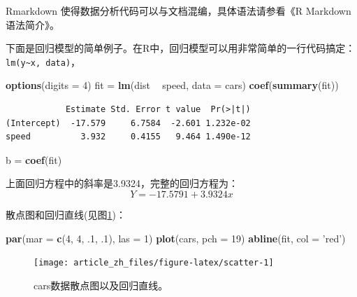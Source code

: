 \documentclass[]{article}
\newenvironment{Shaded}{\begin{snugshade}}{\end{snugshade}}
\newcommand{\DataTypeTok}[1]{\textcolor[rgb]{0.13,0.29,0.53}{#1}}
\newcommand{\DecValTok}[1]{\textcolor[rgb]{0.00,0.00,0.81}{#1}}
\newcommand{\FloatTok}[1]{\textcolor[rgb]{0.00,0.00,0.81}{#1}}
\newcommand{\KeywordTok}[1]{\textcolor[rgb]{0.13,0.29,0.53}{\textbf{#1}}}
\newcommand{\NormalTok}[1]{#1}
\newcommand{\OperatorTok}[1]{\textcolor[rgb]{0.81,0.36,0.00}{\textbf{#1}}}
\newcommand{\StringTok}[1]{\textcolor[rgb]{0.31,0.60,0.02}{#1}}
\begin{document}
Rmarkdown 使得数据分析代码可以与文档混编，具体语法请参看《R
Markdown语法简介》。

下面是回归模型的简单例子。在R中，回归模型可以用非常简单的一行代码搞定：\texttt{lm(y\textasciitilde{}x,\ data)}，

\begin{Shaded}
\begin{Highlighting}[]
\KeywordTok{options}\NormalTok{(}\DataTypeTok{digits =} \DecValTok{4}\NormalTok{)}
\NormalTok{fit =}\StringTok{ }\KeywordTok{lm}\NormalTok{(dist }\OperatorTok{~}\StringTok{ }\NormalTok{speed, }\DataTypeTok{data =}\NormalTok{ cars)}
\KeywordTok{coef}\NormalTok{(}\KeywordTok{summary}\NormalTok{(fit))}
\end{Highlighting}
\end{Shaded}

\begin{verbatim}
            Estimate Std. Error t value  Pr(>|t|)
(Intercept)  -17.579     6.7584  -2.601 1.232e-02
speed          3.932     0.4155   9.464 1.490e-12
\end{verbatim}

\begin{Shaded}
\begin{Highlighting}[]
\NormalTok{b =}\StringTok{ }\KeywordTok{coef}\NormalTok{(fit)}
\end{Highlighting}
\end{Shaded}

上面回归方程中的斜率是3.9324，完整的回归方程为：\[ Y = -17.5791 + 3.9324x\]

散点图和回归直线(见图\ref{fig:scatter})：

\begin{Shaded}
\begin{Highlighting}[]
\KeywordTok{par}\NormalTok{(}\DataTypeTok{mar =} \KeywordTok{c}\NormalTok{(}\DecValTok{4}\NormalTok{, }\DecValTok{4}\NormalTok{, }\FloatTok{.1}\NormalTok{, }\FloatTok{.1}\NormalTok{), }\DataTypeTok{las =} \DecValTok{1}\NormalTok{)}
\KeywordTok{plot}\NormalTok{(cars, }\DataTypeTok{pch =} \DecValTok{19}\NormalTok{)}
\KeywordTok{abline}\NormalTok{(fit, }\DataTypeTok{col =} \StringTok{'red'}\NormalTok{)}
\end{Highlighting}
\end{Shaded}

\begin{figure}

{\centering \texttt{[image: article\_zh\_files/figure-latex/scatter-1]} 

}

\caption{cars数据散点图以及回归直线。}\label{fig:scatter}
\end{figure}
\end{document}
